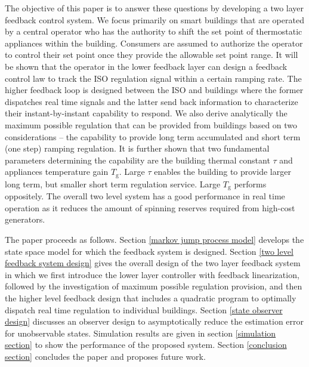 \documentclass[journal]{IEEEtran}
\begin{document}
The objective of this paper is to answer these questions by developing a two layer feedback control system. We focus primarily on smart buildings that are operated by a central operator who has the authority to shift the set point of thermostatic appliances within the building. Consumers are assumed to authorize the operator to control their set point once they provide the allowable set point range. It will be shown that the operator in the lower feedback layer can design a feedback control law to track the ISO regulation signal within a certain ramping rate. The higher feedback loop is designed between the ISO and buildings where the former dispatches real time signals and the latter send back information to characterize their instant-by-instant capability to respond. We also derive analytically the maximum possible regulation that can be provided from buildings based on two considerations -- the capability to provide long term accumulated and short term (one step) ramping regulation. It is further shown that two fundamental parameters determining the capability are the building thermal constant $\tau$ and appliances temperature gain $T_{\textrm{g}}$. Large $\tau$ enables the building to provide larger long term, but smaller short term regulation service. Large $T_{\textrm{g}}$ performs oppositely. The overall two level system has a good performance in real time operation as it reduces the amount of spinning reserves required from high-cost generators.

The paper proceeds as follows. Section \ref{markov jump process model} develops the state space model for which the feedback system is designed. Section \ref{two level feedback system design} gives the overall design of the two layer feedback system in which we first introduce the lower layer controller with feedback linearization, followed by the investigation of maximum possible regulation provision, and then the higher level feedback design that includes a quadratic program to optimally dispatch real time regulation to individual buildings. Section \ref{state observer design} discusses an observer design to asymptotically reduce the estimation error for unobservable states. Simulation results are given in section \ref{simulation section} to show the performance of the proposed system. Section \ref{conclusion section} concludes the paper and proposes future work.
\end{document}
